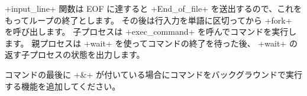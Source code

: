 \ml+input_line+ 関数は EOF に達すると \ml+End_of_file+ を送出するので、これをもってループの終了とします。
その後は行入力を単語に区切ってから \ml+fork+ を呼び出します。
子プロセスは \ml+exec_command+ を呼んでコマンドを実行します。
親プロセスは \ml+wait+ を使ってコマンドの終了を待った後、
\ml+wait+ の返す子プロセスの状態を出力します。

\begin{exercise}
\label{shell}
コマンドの最後に \ml+&+ が付いている場合にコマンドをバックグラウンドで実行する機能を追加してください。
\end{exercise}

